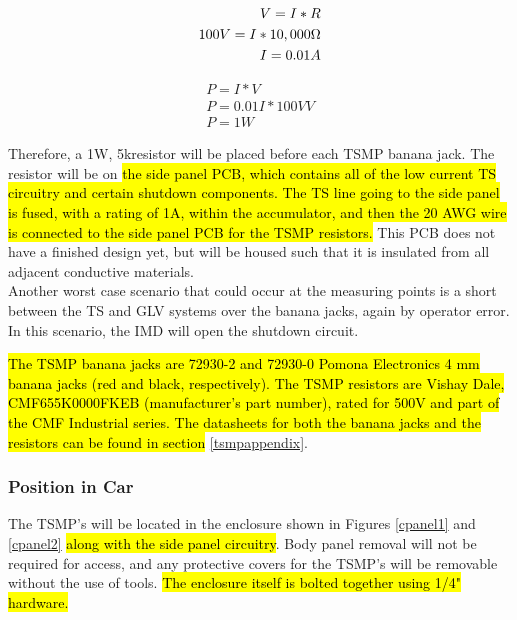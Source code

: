 \documentclass{article}
\DeclareRobustCommand{\hlr}[1]{{\sethlcolor{red}\hl{#1}}}
\begin{document}
            \begin{align}
                V = I * R \\
                100 V = I * 10,000 \ohm \\
                I = 0.01A
            \end{align}

            \begin{align}
                P = I * V \\
                P = 0.01 I * 100V V \\
                P = 1 W
            \end{align}

            Therefore, a 1W, 5k\ohm resistor will be placed before each TSMP banana jack. The resistor will be on \hlr{the side panel PCB, which contains all of the low current TS circuitry and certain shutdown components. The TS line going to the side panel is fused, with a rating of 1A, within the accumulator, and then the 20 AWG wire is connected to the side panel PCB for the TSMP resistors.} This PCB does not have a finished design yet, but will be housed such that it is insulated from all adjacent conductive materials.\\

            Another worst case scenario that could occur at the measuring points is a short between the TS and GLV systems over the banana jacks, again by operator error. In this scenario, the IMD will open the shutdown circuit.

            \hlr{The TSMP banana jacks are 72930-2 and 72930-0 Pomona Electronics 4 mm banana jacks (red and black, respectively). The TSMP resistors are Vishay Dale, CMF655K0000FKEB  (manufacturer's part number), rated for 500V and part of the CMF Industrial series. The datasheets for both the banana jacks and the resistors can be found in section} \ref{tsmpappendix}.


        \subsubsection{Position in Car}

            The TSMP's will be located in the enclosure shown in Figures \ref{cpanel1} and \ref{cpanel2} \hlr{along with the side panel circuitry}. Body panel removal will not be required for access, and any protective covers for the TSMP's will be removable without the use of tools. \hlr{The enclosure itself is bolted together using 1/4" hardware.} %
\end{document}
